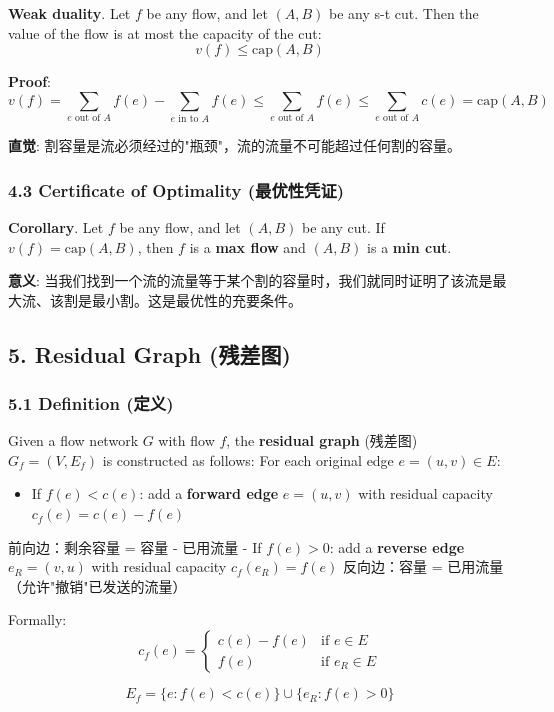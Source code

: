 \documentclass[10pt,a4paper,openany]{ctexbook}
\theoremstyle{definition}
\theoremstyle{remark}
\renewenvironment{quote}
  {\list{}{\leftmargin=1em\rightmargin=0pt\topsep=0.5pt\partopsep=0pt}\item[]}
  {\endlist}
\begin{document}
\textbf{Weak duality}. Let $f$ be any flow, and let $(A, B)$ be any s-t cut. Then the value of the flow is at most the capacity of the cut:
\[
v(f) \le \text{cap}(A, B)
\]

\textbf{Proof}:
\[
v(f) = \sum_{e \text{ out of } A} f(e) - \sum_{e \text{ in to } A} f(e) \le \sum_{e \text{ out of } A} f(e) \le \sum_{e \text{ out of } A} c(e) = \text{cap}(A, B)
\]

\begin{quote}
\textbf{直觉}: 割容量是流必须经过的"瓶颈"，流的流量不可能超过任何割的容量。

\end{quote}

\subsubsection{4.3 Certificate of Optimality (最优性凭证)}

\textbf{Corollary}. Let $f$ be any flow, and let $(A, B)$ be any cut. If $v(f) = \text{cap}(A, B)$, then $f$ is a \textbf{max flow} and $(A, B)$ is a \textbf{min cut}.
\begin{quote}
\textbf{意义}: 当我们找到一个流的流量等于某个割的容量时，我们就同时证明了该流是最大流、该割是最小割。这是最优性的充要条件。

\end{quote}
\vspace{-2pt}

\subsection{5. Residual Graph (残差图)}

\subsubsection{5.1 Definition (定义)}

Given a flow network $G$ with flow $f$, the \textbf{residual graph} (残差图) $G_f = (V, E_f)$ is constructed as follows:
For each original edge $e = (u, v) \in E$:
\begin{itemize}
\item If $f(e) < c(e)$: add a \textbf{forward edge} $e = (u, v)$ with residual capacity $c_f(e) = c(e) - f(e)$
\end{itemize}

\begin{quote}
前向边：剩余容量 = 容量 - 已用流量
- If $f(e) > 0$: add a \textbf{reverse edge} $e_R = (v, u)$ with residual capacity $c_f(e_R) = f(e)$
反向边：容量 = 已用流量（允许"撤销"已发送的流量）

Formally:
\[
c_f(e) = \begin{cases} c(e) - f(e) & \text{if } e \in E \\ f(e) & \text{if } e_R \in E \end{cases}
\]


\[
E_f = \{ e : f(e) < c(e) \} \cup \{ e_R : f(e) > 0 \}
\]


\end{quote}
\end{document}
